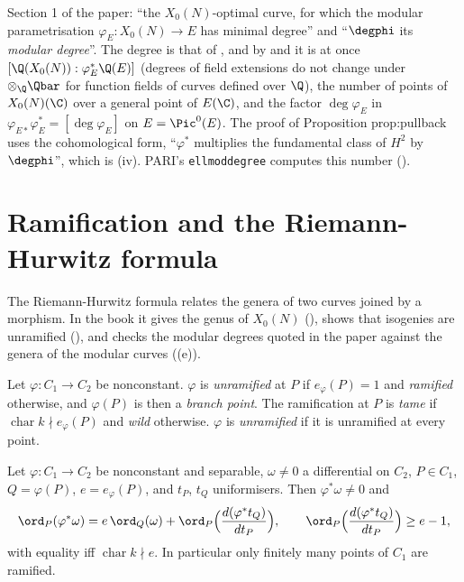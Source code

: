 \begin{paperlink}\label{pl:curves:modular-degree}
Section 1 of the paper: ``the $X_0(N)$-optimal curve, for which the modular parametrisation $\varphi_E\colon X_0(N)\to E$ has minimal degree'' and
``$\degphi$ its \emph{modular degree}''. The degree is that of , and by  and
 it is at once $[\Q(X_0(N)):\varphi_E^*\Q(E)]$ (degrees of field extensions do not change under $\otimes_\Q\Qbar$ for function fields
of curves defined over $\Q$), the number of points of $X_0(N)(\C)$ over a general point of $E(\C)$, and the factor $\deg\varphi_E$ in
$\varphi_{E*}\varphi_E^*=[\deg\varphi_E]$ on $E=\Pic^0(E)$. The proof of Proposition prop:pullback uses the cohomological form, ``$\varphi^*$ multiplies the fundamental
class of $H^2$ by $\degphi$'', which is (iv). PARI's \texttt{ellmoddegree} computes this number ().
\end{paperlink}

\section{Ramification and the Riemann-Hurwitz formula}\label{sec:curves:hurwitz}

The Riemann-Hurwitz formula relates the genera of two curves joined by a morphism. In the book it gives the genus of $X_0(N)$ (), shows that
isogenies are unramified (), and checks the modular degrees quoted in the paper against the genera of the modular curves
((e)).

\begin{definition}[ramification]\label{def:curves:ramification}
Let $\varphi\colon C_1\to C_2$ be nonconstant. $\varphi$ is \emph{unramified} at $P$ if $e_\varphi(P)=1$ and \emph{ramified} otherwise, and $\varphi(P)$ is then a \emph{branch
point}. The ramification at $P$ is \emph{tame} if $\operatorname{char}k\nmid e_\varphi(P)$ and \emph{wild} otherwise. $\varphi$ is \emph{unramified} if it is unramified at every point.
\end{definition}

\begin{lemma}\label{lem:curves:local-differential}
Let $\varphi\colon C_1\to C_2$ be nonconstant and separable, $\omega\ne0$ a differential on $C_2$, $P\in C_1$, $Q=\varphi(P)$, $e=e_\varphi(P)$, and $t_P$, $t_Q$ uniformisers. Then
$\varphi^*\omega\ne0$ and
\[
\ord_P(\varphi^*\omega)=e\,\ord_Q(\omega)+\ord_P\Bigl(\frac{d(\varphi^*t_Q)}{dt_P}\Bigr),\qquad \ord_P\Bigl(\frac{d(\varphi^*t_Q)}{dt_P}\Bigr)\ge e-1,
\]
with equality iff $\operatorname{char}k\nmid e$. In particular only finitely many points of $C_1$ are ramified.
\end{lemma}

